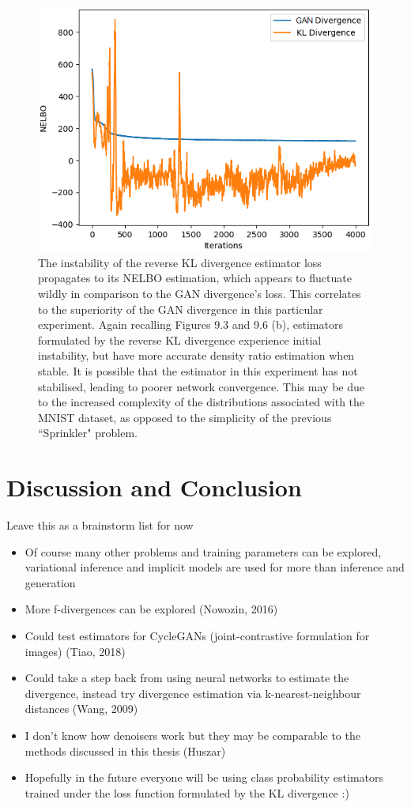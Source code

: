 \documentclass[honours,12pt]{unswthesis}
\numberwithin{equation}{section}
\theoremstyle{definition}
\begin{document}
\begin{figure}[h]
\centering
\includegraphics[width=0.49\linewidth]{part4nelbos/PCADVvsPCKLD.png}
\caption{\small The instability of the reverse KL divergence estimator loss propagates to its NELBO estimation, which appears to fluctuate wildly in comparison to the GAN divergence's loss. This correlates to the superiority of the GAN divergence in this particular experiment. Again recalling Figures 9.3 and 9.6 (b), estimators formulated by the reverse KL divergence experience initial instability, but have more accurate density ratio estimation when stable. It is possible that the estimator in this experiment has not stabilised, leading to poorer network convergence. This may be due to the increased complexity of the distributions associated with the MNIST dataset, as opposed to the simplicity of the previous ``Sprinkler" problem.}
\end{figure}
\chapter{Discussion and Conclusion}
Leave this as a brainstorm list for now
\begin{itemize}
\item Of course many other problems and training parameters can be explored, variational inference and implicit models are used for more than inference and generation
\item More f-divergences can be explored (Nowozin, 2016)
\item Could test estimators for CycleGANs (joint-contrastive formulation for images) (Tiao, 2018)
\item Could take a step back from using neural networks to estimate the divergence, instead try divergence estimation via k-nearest-neighbour distances (Wang, 2009)
\item I don't know how denoisers work but they may be comparable to the methods discussed in this thesis (Huszar)
\item Hopefully in the future everyone will be using class probability estimators trained under the loss function formulated by the KL divergence :)
\end{itemize}
\end{document}
